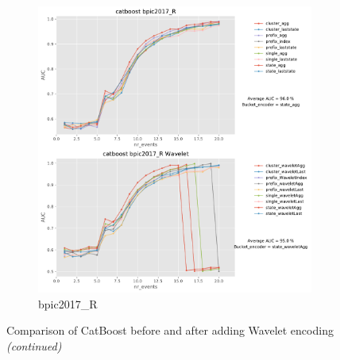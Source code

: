 \documentclass[twoside,11pt]{Latex/Classes/PhDthesisPSnPDF}
\begin{document}
\begin{figure}[!htbp]
	\medskip
	\begin{subfigure}{0.48\textwidth}
		\includegraphics[width=\linewidth]{images/wavelet/graphs2cat/bpic2017_R.pdf}	
		\caption{bpic2017\_R} 
	\end{subfigure}\hspace*{\fill}
	\caption{Comparison of CatBoost before and after adding Wavelet encoding \textit{(continued)}}
	\label{fig:wc3}
\end{figure}



\end{document}
